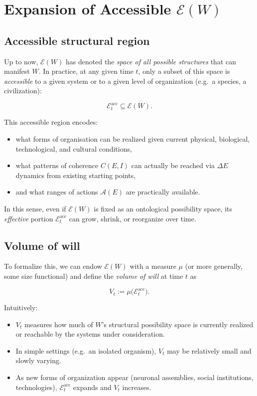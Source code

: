 \documentclass[12pt,a4paper]{report}
\newcommand{\Will}{W}
\begin{document}
\section{Expansion of Accessible \texorpdfstring{$\mathcal{E}(\Will)$}{E(W)}}

\subsection*{Accessible structural region}

Up to now, \(\mathcal{E}(\Will)\) has denoted the \emph{space of all possible structures} that can manifest \(\Will\). In practice, at any given time \(t\), only a subset of this space is \emph{accessible} to a given system or to a given level of organization (e.g.\ a species, a civilization):

\[
    \mathcal{E}_t^{\mathrm{acc}} \subseteq \mathcal{E}(\Will).
\]

This accessible region encodes:

\begin{itemize}[leftmargin=2em]
    \item what forms of organisation can be realized given current physical, biological, technological, and cultural conditions,
    \item what patterns of coherence \(C(E, I)\) can actually be reached via $\Delta E$ dynamics from existing starting points,
    \item and what ranges of actions \(\mathcal{A}(E)\) are practically available.
\end{itemize}

In this sense, even if \(\mathcal{E}(\Will)\) is fixed as an ontological possibility space, its \emph{effective} portion \(\mathcal{E}_t^{\mathrm{acc}}\) can grow, shrink, or reorganize over time.

\subsection*{Volume of will}

To formalize this, we can endow \(\mathcal{E}(\Will)\) with a measure \(\mu\) (or more generally, some size functional) and define the \emph{volume of will} at time \(t\) as

\[
    V_t := \mu\bigl(\mathcal{E}_t^{\mathrm{acc}}\bigr).
\]

Intuitively:

\begin{itemize}[leftmargin=2em]
    \item \(V_t\) measures how much of \(\Will\)'s structural possibility space is currently realized or reachable by the systems under consideration.
    \item In simple settings (e.g.\ an isolated organism), \(V_t\) may be relatively small and slowly varying.
    \item As new forms of organization appear (neuronal assemblies, social institutions, technologies), \(\mathcal{E}_t^{\mathrm{acc}}\) expands and \(V_t\) increases.
\end{itemize}
\end{document}
